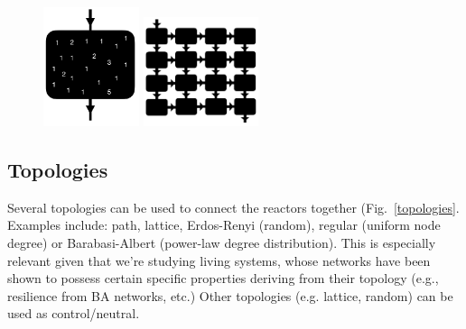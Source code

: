 \documentclass[11pt]{article}
\begin{document}
\begin{figure}[h]
  \centering
  \includegraphics[width=0.25\textwidth]{figures/system/single-reactor.pdf}
  \hspace{0.10\textwidth}
  \includegraphics[width=0.30\textwidth]{figures/system/ensemble.pdf}
  \caption{\color{red}\protect\lipsum[2]}
  \label{fig:reactor-ensemble}
\end{figure}

\subsection{Topologies}

Several topologies can be used to connect the reactors together (Fig.~\ref{topologies}. Examples include: path, lattice, Erdos-Renyi (random), regular (uniform node degree) or Barabasi-Albert (power-law degree distribution). This is especially relevant given that we’re studying living systems, whose networks have been shown to possess certain specific properties deriving from their topology (e.g., resilience from BA networks, etc.) Other topologies (e.g. lattice, random) can be used as control/neutral.
\end{document}
